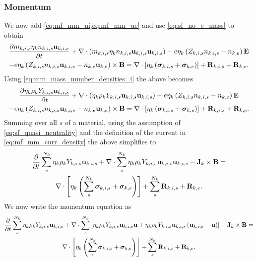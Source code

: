 \documentclass[a4paper,11pt]{report}
\begin{document}
\subsubsection{Momentum}

We now add \cref{eq:mf_mm_ui,eq:mf_mm_ue} and use \cref{eq:sf_no_e_mass} to obtain
\begin{multline*}
    \frac{\partial m_{k,i,s} \eta_k n_{k,i,s} \mathbf{u}_{k,i,s}}{\partial t} + \nabla \cdot \left( m_{k,i,s} \eta_k n_{k,i,s} \mathbf{u}_{k,i,s} \mathbf{u}_{k,i,s} \right) -e \eta_k \left( Z_{k,i,s} n_{k,i,s} - n_{k,e} \right) \mathbf{E} \\
    - e \eta_k \left( Z_{k,i,s} n_{k,i,s} \mathbf{u}_{k,i,s} - n_{k,e} \mathbf{u}_{k,e} \right) \times \mathbf{B} = \nabla \cdot \left[ \eta_k \left( \bm \sigma_{k,i,s} + \bm \sigma_{k,e} \right) \right] + \mathbf{R}_{k,i,s} + \mathbf{R}_{k,e}.
\end{multline*}
Using \cref{eq:mm_mass_number_densities_i} the above becomes
\begin{multline*}
    \frac{\partial \eta_k \rho_k Y_{k,i,s} \mathbf{u}_{k,i,s}}{\partial t} + \nabla \cdot \left( \eta_k \rho_k Y_{k,i,s} \mathbf{u}_{k,i,s} \mathbf{u}_{k,i,s} \right) -e \eta_k \left( Z_{k,i,s} n_{k,i,s} - n_{k,e} \right) \mathbf{E} \\
    - e \eta_k \left( Z_{k,i,s} n_{k,i,s} \mathbf{u}_{k,i,s} - n_{k,e} \mathbf{u}_{k,e} \right) \times \mathbf{B} = \nabla \cdot \left[ \eta_k \left( \bm \sigma_{k,i,s} + \bm \sigma_{k,e} \right) \right] + \mathbf{R}_{k,i,s} + \mathbf{R}_{k,e}.
\end{multline*}
Summing over all $s$ of a material, using the assumption of \cref{eq:sf_quasi_neutrality} and the definition of the current in \cref{eq:mf_mm_curr_density} the above simplifies to
\begin{multline*}
    \frac{\partial}{\partial t} \sum_s^{N_k} \eta_k \rho_k Y_{k,i,s} \mathbf{u}_{k,i,s} + \nabla \cdot \sum_s^{N_k} \eta_k \rho_k Y_{k,i,s} \mathbf{u}_{k,i,s} \mathbf{u}_{k,i,s} - \mathbf{J}_k \times \mathbf{B} = \\
    \nabla \cdot \left[ \eta_k \left( \sum_s^{N_k} \bm \sigma_{k,i,s} + \bm \sigma_{k,e} \right) \right] + \sum_s^{N_k} \mathbf{R}_{k,i,s} + \mathbf{R}_{k,e}.
\end{multline*}
We now write the momentum equation as
\begin{multline*}
    \frac{\partial}{\partial t} \sum_s^{N_k} \eta_k \rho_k Y_{k,i,s} \mathbf{u}_{k,i,s} + \nabla \cdot \sum_s^{N_k} \left[ \eta_k \rho_k Y_{k,i,s} \mathbf{u}_{k,i,s} \mathbf{u} + \eta_k \rho_k Y_{k,i,s} \mathbf{u}_{k,i,s} \left( \mathbf{u}_{k,i,s} - \mathbf{u} \right) \right] - \mathbf{J}_k \times \mathbf{B} = \\
    \nabla \cdot \left[ \eta_k \left( \sum_s^{N_k} \bm \sigma_{k,i,s} + \bm \sigma_{k,e} \right) \right] + \sum_s^{N_k} \mathbf{R}_{k,i,s} + \mathbf{R}_{k,e}.
\end{multline*}
\end{document}
